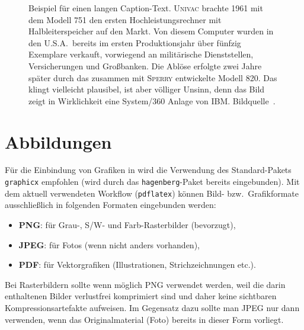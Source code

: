 \begin{figure}
\centering
{}  %
\caption{Beispiel für einen langen Caption-Text. \textsc{Univac}
brachte 1961 mit dem Modell 751 den ersten Hochleistungsrechner
mit Halbleiterspeicher auf den Markt. Von diesem Computer wurden
in den U.S.A.\ bereits im ersten Produktionsjahr über fünfzig
Exemplare verkauft, vorwiegend an militärische Dienststellen,
Versicherungen und Großbanken. Die Ablöse erfolgte zwei Jahre
später durch das zusammen mit \textsc{Sperry} entwickelte Modell 820.
Das klingt vielleicht plausibel, ist aber völliger Unsinn, denn das
Bild zeigt in Wirklichkeit eine System/360 Anlage von IBM. 
Bildquelle~\cite{IBM360}.} 
\label{fig:ibm360}
\end{figure}





\section{Abbildungen}

Für die Einbindung von Grafiken in \latex wird die Verwendung des Stan\-dard-Pakets
\texttt{graphicx} \cite{Carlisle99} empfohlen 
(wird durch das \texttt{hagenberg}-Paket bereits eingebunden). 
Mit dem aktuell verwendeten Workflow (\texttt{pdflatex})
können Bild- bzw.\ Grafikformate ausschließlich 
in folgenden Formaten eingebunden werden:
%
\begin{itemize}
	\item \textbf{PNG}: für Grau-, S/W- und Farb-Rasterbilder (bevorzugt),
	\item \textbf{JPEG}: für Fotos (wenn nicht anders vorhanden),
	\item \textbf{PDF}: für Vektorgrafiken (Illustrationen, Strichzeichnungen etc.).
\end{itemize}
%
Bei Rasterbildern sollte wenn möglich PNG verwendet werden, weil die darin 
enthaltenen Bilder verlustfrei komprimiert sind und daher keine sichtbaren Kompressionsartefakte
aufweisen. Im Gegensatz dazu sollte man JPEG nur dann verwenden, wenn das Originalmaterial
(Foto) bereits in dieser Form vorliegt.


